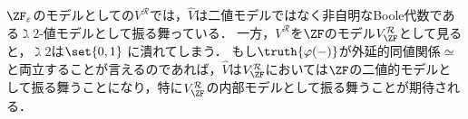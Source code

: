 \documentclass[realisability.tex]{subfiles}
\begin{document}
$\ZFe$のモデルとしての$V^{\mathcal{R}}$では，$\hat{V}$は二値モデルではなく非自明なBoole代数である$\gimel 2$-値モデルとして振る舞っている．
一方，$V^{\mathcal{R}}$を$\ZF$のモデル$V^{\mathcal{R}}_{\ZF}$として見ると，$\gimel 2$は$\set{0, 1}$ に潰れてしまう．
もし$\truth{\varphi(-)}$が外延的同値関係$\simeq$と両立することが言えるのであれば，$\hat{V}$は$V^{\mathcal{R}}_{\ZF}$においては$\ZF$の二値的モデルとして振る舞うことになり，特に$V^{\mathcal{R}}_{\ZF}$の内部モデルとして振る舞うことが期待される．

\nocite{Kamo:2007}
\end{document}
